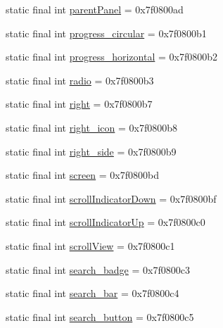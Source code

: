 \begin{DoxyCompactItemize}
static final int \mbox{\hyperlink{classcom_1_1synnapps_1_1carouselview_1_1_r_1_1id_a0ae75e2662375caed4eea6225bfab63c}{parent\+Panel}} = 0x7f0800ad
\item 
static final int \mbox{\hyperlink{classcom_1_1synnapps_1_1carouselview_1_1_r_1_1id_a2ed499393b7257372fa35ac8d432a5e4}{progress\+\_\+circular}} = 0x7f0800b1
\item 
static final int \mbox{\hyperlink{classcom_1_1synnapps_1_1carouselview_1_1_r_1_1id_af347af0824c085256c6a173dac35fa82}{progress\+\_\+horizontal}} = 0x7f0800b2
\item 
static final int \mbox{\hyperlink{classcom_1_1synnapps_1_1carouselview_1_1_r_1_1id_ad1f8a928ff6930f8186b92fbff0f2d51}{radio}} = 0x7f0800b3
\item 
static final int \mbox{\hyperlink{classcom_1_1synnapps_1_1carouselview_1_1_r_1_1id_a8bd8da5fc8bb6760926d8e72e407e833}{right}} = 0x7f0800b7
\item 
static final int \mbox{\hyperlink{classcom_1_1synnapps_1_1carouselview_1_1_r_1_1id_a162e60aaae7c713b82e6021a425817e7}{right\+\_\+icon}} = 0x7f0800b8
\item 
static final int \mbox{\hyperlink{classcom_1_1synnapps_1_1carouselview_1_1_r_1_1id_a5bc4d07ec534b730059877b448e20194}{right\+\_\+side}} = 0x7f0800b9
\item 
static final int \mbox{\hyperlink{classcom_1_1synnapps_1_1carouselview_1_1_r_1_1id_a0ed25cfc7fcee06c4c18c08b20e16424}{screen}} = 0x7f0800bd
\item 
static final int \mbox{\hyperlink{classcom_1_1synnapps_1_1carouselview_1_1_r_1_1id_aabebbd918af2bd50b50e895a5c658b68}{scroll\+Indicator\+Down}} = 0x7f0800bf
\item 
static final int \mbox{\hyperlink{classcom_1_1synnapps_1_1carouselview_1_1_r_1_1id_a937975a1de74652b278c4ec42671b592}{scroll\+Indicator\+Up}} = 0x7f0800c0
\item 
static final int \mbox{\hyperlink{classcom_1_1synnapps_1_1carouselview_1_1_r_1_1id_a790a7016cdc814643d9b698ef2751967}{scroll\+View}} = 0x7f0800c1
\item 
static final int \mbox{\hyperlink{classcom_1_1synnapps_1_1carouselview_1_1_r_1_1id_aeae07fc3ab96ee77e780d153b1b75caf}{search\+\_\+badge}} = 0x7f0800c3
\item 
static final int \mbox{\hyperlink{classcom_1_1synnapps_1_1carouselview_1_1_r_1_1id_ae32fb0249398fbe28de78c3051569ed5}{search\+\_\+bar}} = 0x7f0800c4
\item 
static final int \mbox{\hyperlink{classcom_1_1synnapps_1_1carouselview_1_1_r_1_1id_a368ec3c6e2e7dfe400c0b431e2feb1bc}{search\+\_\+button}} = 0x7f0800c5

\end{DoxyCompactItemize}
